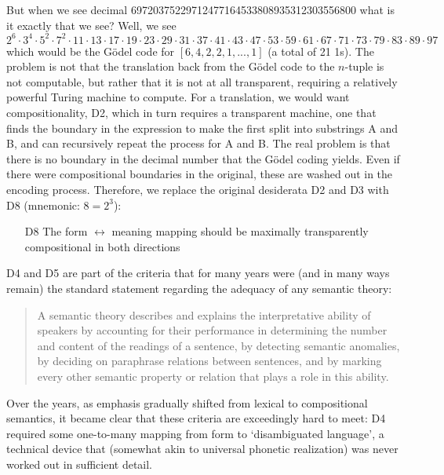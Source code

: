 \documentclass[output=paper,colorlinks=true,citecolor=brown]{langscibook}
\begin{document}
But when we see decimal 69720375229712477164533808935312303556800 what is it
exactly that we see? Well, we see $2^6\cdot 3^4\cdot 5^2\cdot 7^2\cdot 11\cdot
13\cdot 17\cdot 19\cdot 23\cdot 29\cdot 31\cdot 37\cdot 41\cdot 43\cdot
47\cdot 53\cdot 59\cdot 61\cdot 67\cdot 71\cdot 73\cdot 79\cdot 83\cdot
89\cdot 97$ which would be the Gödel code for $[6,4,2,2,1,...,1]$ (a
total of 21 1s). The problem is not that the translation back from the Gödel
code to the $n$-tuple is not computable, but rather that it is not at all
transparent, requiring a relatively powerful Turing machine to compute. For a
translation, we would want compositionality, D2, which in turn requires a
transparent machine, one that finds the boundary in the expression to make the
first split into substrings A and B, and can recursively repeat the process
for A and B. The real problem is that there is no boundary in the decimal
number that the Gödel coding yields. Even if there were compositional
boundaries in the original, these are washed out in the encoding process.
Therefore, we replace the original desiderata D2 and D3 with D8 (mnemonic:
$8=2^3$):

\begin{itemize}
\item[D8] The form $\leftrightarrow$ meaning mapping should be maximally
  transparently compositional in both directions
\end{itemize}

\medskip\noindent D4 and D5 are part of the \citet{Katz:1963} criteria that
for many years were (and in many ways remain) the standard statement regarding
the adequacy of any semantic theory:

\begin{quote}
A semantic theory describes and explains the interpretative ability of
speakers by accounting for their performance in determining the number and
content of the readings of a sentence, by detecting semantic anomalies, by
deciding on paraphrase relations between sentences, and by marking every other
semantic property or relation that plays a role in this ability.
\end{quote}

\noindent 
Over the years, as emphasis gradually shifted from lexical to compositional
semantics, it became clear that these criteria are exceedingly hard to meet:
D4 required some one-to-many mapping from form to `disambiguated language', a
technical device that (somewhat akin to universal phonetic realization) was
never worked out in sufficient detail.
\end{document}
